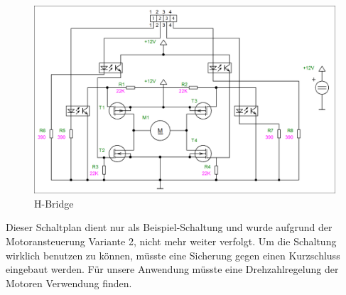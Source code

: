 \begin{figure}[H] 
\begin{center}

\includegraphics[width=15cm]{Bilder/Schaltplan/Schaltplan_HBridge}
\caption{H-Bridge}
\label{HBridge}

\end{center}
\end{figure}

Dieser Schaltplan dient nur als Beispiel-Schaltung und wurde aufgrund der Motoransteuerung Variante 2, nicht mehr weiter verfolgt. Um die Schaltung wirklich benutzen zu können, müsste eine Sicherung gegen einen Kurzschluss eingebaut werden. Für unsere Anwendung müsste eine Drehzahlregelung der Motoren Verwendung finden.
\newpage
